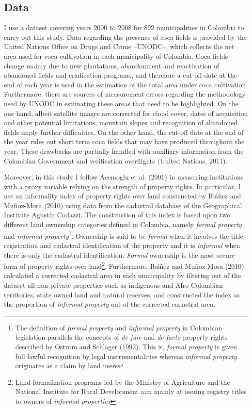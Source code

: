 \documentclass[a4paper, 12pt]{article}
\begin{document}
\subsection{Data}
\label{data}

I use a dataset covering years 2000 to 2008 for 892 municipalities in Colombia to carry out this study. Data regarding the presence of coca fields is provided by the United Nations Office on Drugs and Crime --UNODC--, which collects the net area used for coca cultivation in each municipality of Colombia. Coca fields change mainly due to new plantations, abandonment and reactivation of abandoned fields and eradication programs, and therefore a cut-off date at the end of each year is used in the estimation of the total area under coca cultivation. Furthermore, there are sources of measurement errors regarding the methodology used by UNODC in estimating these areas that need to be highlighted. On the one hand, albeit satellite images are corrected for cloud cover, dates of acquisition and other potential limitations, mountain slopes and recognition of abandoned fields imply further difficulties. On the other hand, the cut-off date at the end of the year rules out short term coca fields that may have produced throughout the year. These drawbacks are partially handled with auxiliary information from the Colombian Government and verification overflights (United Nations, 2011).

Moreover, in this study I follow Acemoglu et al. (2001) in measuring institutions with a proxy variable relying on the strength of property rights. In particular, I use an informality index of property rights over land constructed by Ib\'{a}\~{n}ez and Mu\~{n}oz-Mora (2010) using data from the cadastral database of the Geographical Institute Agust\'{i}n Codazzi. The construction of this index is based upon two different land ownership categories defined in Colombia, namely \emph{formal property} and \emph{informal property}\footnote{The definition of \emph{formal property} and \emph{informal property} in Colombian legislation parallels the concepts of \emph{de jure} and \emph{de facto} property rights described by Ostrom and Schlager (1992). This is, \emph{formal property} is given full lawful recognition by legal instrumentalities whereas \emph{informal property} originates as a claim by land users}. Ownership is said to be \emph{formal} when it involves the title registration and cadastral identification of the property and it is \emph{informal} when there is only the cadastral identification. \emph{Formal} ownership is the most secure form of property rights over land\footnote{Land formalization programs led by the Ministry of Agriculture and the National Institute for Rural Development aim mainly at issuing registry titles to owners of \emph{informal properties}}. Furthermore, Ib\'{a}\~{n}ez and Mu\~{n}oz-Mora (2010) calculated a corrected cadastral area in each municipality by filtering out of the dataset all non-private properties such as indigenous and Afro-Colombian territories, state owned land and natural reserves, and constructed the index as the proportion of \emph{informal property} out of the corrected cadastral area.
\end{document}
